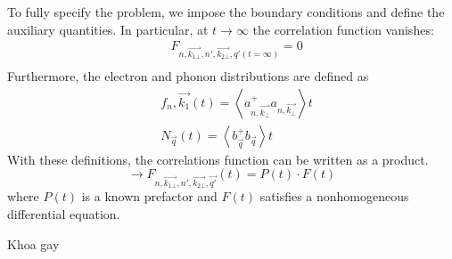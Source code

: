 \documentclass{article}
\begin{document}
To fully specify the problem, we impose the boundary conditions and define the auxiliary quantities. In particular, at $t\to \infty$ the correlation function vanishes:
\begin{align*}
    & F_{n,\vec{k_{1\bot}}, n', \vec{k_{2\bot}},q'(t = \infty )} = 0 \\
\end{align*}
Furthermore, the electron and phonon distributions are defined as
\begin{align*}
    & f_n, \vec{k_{1}}(t) = \left \langle a^+_{n, \vec{k_{\bot}}}a_{n, \vec{k_\bot}} \right \rangle t \\
    & N_{\vec{q}}(t) = \left \langle b^+_{\vec{q}} b_{\vec{q}} \right\rangle t
\end{align*}
With these definitions, the correlations function can be written as a product.
\begin{equation*}
    \rightarrow F_{n, \vec{k_{1\bot}}, n', \vec{k_{2\bot}}, \vec{q'}}{(t)}= P(t) \cdot F (t)
\end{equation*}
where $P(t)$ is a known prefactor and $F(t)$ satisfies a nonhomogeneous differential equation.

Khoa gay
\end{document}
